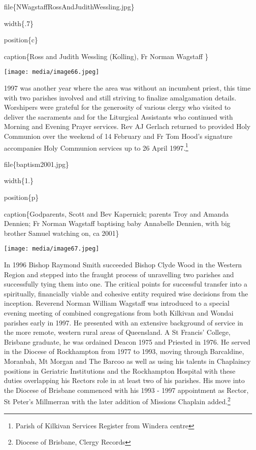file\{NWagstaffRossAndJudithWessling.jpg\}

width\{.7\}

position\{c\}

caption\{Ross and Judith Wessling (Kolling), Fr Norman Wagstaff \}

\texttt{[image: media/image66.jpeg]}

1997 was another year where the area was without an incumbent priest, this time with two parishes involved and still striving to finalize amalgamation details. Worshipers were grateful for the generosity of various clergy who visited to deliver the sacraments and for the Liturgical Assistants who continued with Morning and Evening Prayer services. Rev AJ Gerlach returned to provided Holy Communion over the weekend of 14 February and Fr Tom Hood's signature accompanies Holy Communion services up to 26 April 1997.\footnote{Parish of Kilkivan Services Register from Windera centre}

file\{baptism2001.jpg\}

width\{1.\}

position\{p\}

caption\{Godparents, Scott and Bev Kapernick; parents Troy and Amanda Dennien; Fr Norman Wagstaff baptising baby Annabelle Dennien, with big brother Samuel watching on, ca 2001\}

\texttt{[image: media/image67.jpeg]}

In 1996 Bishop Raymond Smith succeeded Bishop Clyde Wood in the Western Region and stepped into the fraught process of unravelling two parishes and successfully tying them into one. The critical points for successful transfer into a spiritually, financially viable and cohesive entity required wise decisions from the inception. Reverend Norman William Wagstaff was introduced to a special evening meeting of combined congregations from both Kilkivan and Wondai parishes early in 1997. He presented with an extensive background of service in the more remote, western rural areas of Queensland. A St Francis' College, Brisbane graduate, he was ordained Deacon 1975 and Priested in 1976. He served in the Diocese of Rockhampton from 1977 to 1993, moving through Barcaldine, Moranbah, Mt Morgan and The Barcoo as well as using his talents in Chaplaincy positions in Geriatric Institutions and the Rockhampton Hospital with these duties overlapping his Rectors role in at least two of his parishes. His move into the Diocese of Brisbane commenced with his 1993 - 1997 appointment as Rector, St Peter's Millmerran with the later addition of Missions Chaplain added.\footnote{Diocese of Brisbane, Clergy Records}

